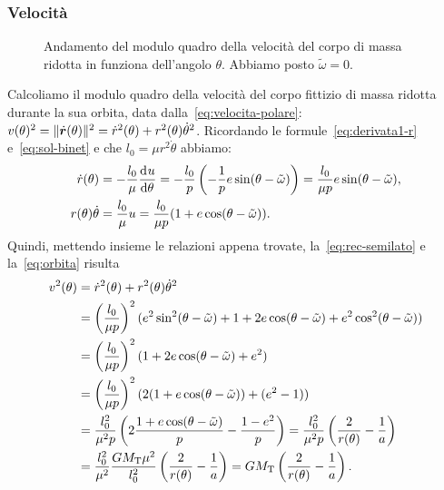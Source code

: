 \subsubsection{Velocità}
\label{sec:velocita}
\begin{figure}
  \centering
  
  \caption{Andamento del modulo quadro della velocità del corpo di massa ridotta
  in funziona dell'angolo $\theta$. Abbiamo posto $\tilde\omega=0$.}
  \label{fig:velocita}
\end{figure}
Calcoliamo il modulo quadro della velocità del corpo fittizio di massa ridotta
durante la sua orbita, data dalla~\eqref{eq:velocita-polare}: $v(\theta)^2 =
\lVert\dot{\bm{r}}(\theta)\rVert^2 = \dot{r}^2(\theta) +
r^2(\theta)\dot{\theta}^2$. Ricordando le formule~\eqref{eq:derivata1-r}
e~\eqref{eq:sol-binet} e che $l_0=\mu r^2\dot{\theta}$ abbiamo:
\begin{subequations}
  \begin{align}
    \dot{r}(\theta) &= -\frac{l_0}{\mu}\frac{{\mathop{}\!\mathrm{d}^{}}u}{\mathop{}\!\mathrm{d} {\theta}^{}} = -\frac{l_0}{p}
    \left(
      -\frac{1}{p}e\sin(\theta-\tilde\omega)
    \right) = \frac{l_0}{\mu p}e\sin(\theta-\tilde\omega), \\
    r(\theta)\dot{\theta} &= \frac{l_0}{\mu}u = \frac{l_0}{\mu
      p}(1+e\cos(\theta-\tilde\omega)).
  \end{align}
\end{subequations}
Quindi, mettendo insieme le relazioni appena trovate, la~\eqref{eq:rec-semilato}
e la~\eqref{eq:orbita} risulta
\begin{equation}
  \begin{split}
    v^2(\theta) &= \dot{r}^2(\theta) + r^2(\theta)\dot{\theta}^2 \\
    &= \left(
      \frac{l_0}{\mu p}
    \right)^2(e^2\sin^2(\theta-\tilde\omega) + 1 + 2e\cos(\theta-\tilde\omega) +
    e^2\cos^2(\theta-\tilde\omega)) \\
    &= \left(
      \frac{l_0}{\mu p}
    \right)^2(1+2e\cos(\theta-\tilde\omega)+e^2) \\
    &= \left(
      \frac{l_0}{\mu p}
    \right)^2(2(1+e\cos(\theta-\tilde\omega)) + (e^2-1)) \\
    &= \frac{l_0^2}{\mu^2p}
    \left(
      2\frac{1+e\cos(\theta-\tilde\omega)}{p} - \frac{1-e^2}{p}
    \right) = \frac{l_0^2}{\mu^2 p}
    \left(
      \frac{2}{r(\theta)} - \frac{1}{a}
    \right) \\
    &= \frac{l_0^2}{\mu^2}\frac{GM_\textup{T}\mu^2}{l_0^2}
    \left(
      \frac{2}{r(\theta)} - \frac{1}{a}
    \right) = GM_\textup{T}
    \left(
      \frac{2}{r(\theta)} - \frac{1}{a}
    \right).
  \end{split}
\end{equation}
